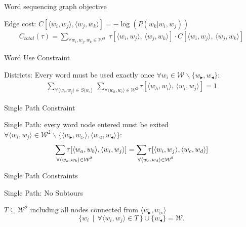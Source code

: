 \documentclass[]{beamer}
\newcommand{\fullwidthtikz}[1]{\resizebox{0.9\textwidth}{!}{
		\centering
		}}
\newcommand{\s}{\tilde{s}}
\renewcommand{\s}{w_{\blacktriangleright}}
\renewcommand{\ss}{w_{\triangleright}}
\newcommand{\e}{w_{\triangleleft}}
\newcommand{\ee}{w_{\blacktriangleleft}}
\newcommand{\W}{\mathcal{W}}
\newcommand{\displayunskip}{\vspace{0pt}}
\begin{document}
\begin{frame}{Word sequencing graph objective}
	\vspace{-1em}
	\fullwidthtikz{../figs/ordergraphpaper}
	
	\alert{Edge cost:} $C[\langle w_{i},w_{j}\rangle,\langle w_{j},w_{k}\rangle]=-\log\left(P(w_{k}|w_{i},w_{j})\right)$
	\displayunskip
	\begin{gather*}
	C_{total}(\tau)= \sum_{\forall w_i,w_j,w_k \in \W^{3}}
		\;\tau[\langle w_{i},w_{j}\rangle,\,\langle w_{j},w_{k}\rangle] \cdot C[\langle w_{i},w_{j}\rangle,\,\langle w_{j},w_{k}\rangle]
	\end{gather*}

\end{frame}


\begin{frame}{Word Use Constraint}
	\vspace{-1em}
	\fullwidthtikz{../figs/ordergraphpaper}
	
	\alert{Districts:} Every word must be used exactly once
	$\forall w_{i}\in\W\backslash\{\s,\ee\}$:
	\displayunskip
	\begin{gather*}
	\sum_{\forall\langle w_{i},w_{j}\rangle\in S(w_{i}\rangle} \:
	\sum_{\forall\langle w_{h},w_{i}\rangle\in\W^{2}}
	\tau[\langle w_{h},w_{i}\rangle,\,\langle w_{i},w_{j}\rangle]=1
	\end{gather*}
\end{frame}



\begin{frame}{Single Path Constraint}
	\vspace{-1em}
	\fullwidthtikz{../figs/ordergraphpaper}
	
	\alert{Single Path:} every word node entered must be exited
	\\$\forall\langle w_{i},w_{j}\rangle\in\W^{2}\backslash\{\langle\s,\ss\rangle,\langle\e,\ee\rangle\}$: 
	\begin{gather*}%
	\sum_{\mathrlap{\!\!\!\!\forall\langle w_{a},w_{b}\rangle\in\W^{2}}}\tau[\langle w_{a},w_{b}\rangle,\langle w_{i},w_{j}\rangle]
	=\sum_{\mathrlap{\!\!\!\!\forall\langle w_{c},w_{d}\rangle\in\W^{2}}}\tau[\langle w_{i},w_{j}\rangle,\langle w_{c},w_{d}\rangle]
	\end{gather*}
\end{frame}

\begin{frame}{Single Path Constraints}
	\vspace{-1em}
	\fullwidthtikz{../figs/ordergraphpaper}
	
	\alert{Single Path:} No Subtours
	
	$T\subseteq \W^{2}$ including all nodes connected from $\langle\s,\ss\rangle$
	\[\{w_{i}\,\mid\,\forall\langle w_{i},w_{j}\rangle\in T\,\}\cup\{\ee\} = \W.\]
\end{frame}
\end{document}
